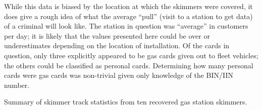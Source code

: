 While this data is biased by the location at which the skimmers were covered, it does give a rough idea of what the
average ``pull'' (visit to a station to get data) of a criminal will look like.
%
The station in question was ``average'' in customers per day;
%
it is likely that the values presented here could be over or underestimates depending on the location of installation.
%
Of the cards in question, only three explicitly appeared to be gas cards given out to fleet vehicles; the others could
be classified as personal cards.
%
Determining how many personal cards were gas cards was non-trivial given only knowledge of the BIN/IIN number.


\begin{table}
    \centering
    
    \caption{Summary of skimmer track statistics from ten recovered gas station skimmers.}
    \label{tab:skim-dump-res}
\end{table}

